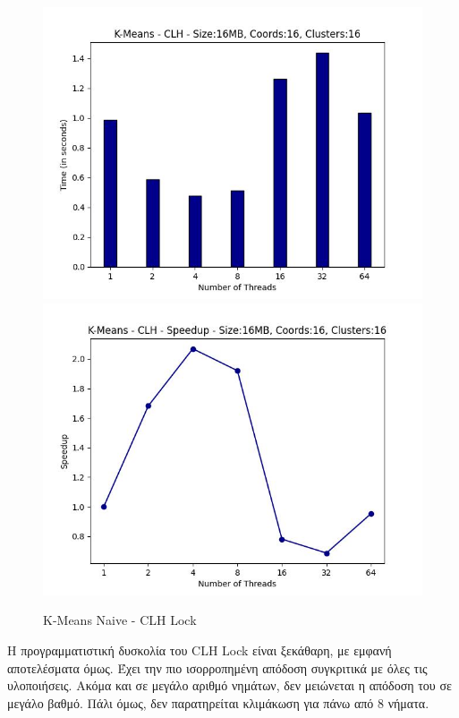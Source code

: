 \documentclass[../final_report.tex]{subfiles}
\begin{document}
\begin{figure}[H]
    \centering
        \includegraphics[scale=0.48]{outFilesCores/plots/kmeans_locks_clh.jpg}
        \includegraphics[scale=0.48]{outFilesCores/plots/kmeans_locks_clh_speedup.jpg}
    \caption{K-Means Naive - CLH Lock}
    \label{fig:K-Means Naive - CLH Lock}
\end{figure}

Η προγραμματιστική δυσκολία του CLH Lock είναι ξεκάθαρη, με εμφανή αποτελέσματα όμως. Έχει την πιο
ισορροπημένη απόδοση συγκριτικά με όλες τις υλοποιήσεις. Ακόμα και σε μεγάλο αριθμό νημάτων, δεν μειώνεται η 
απόδοση του σε μεγάλο βαθμό. Πάλι όμως, δεν παρατηρείται κλιμάκωση για πάνω από 8 νήματα. 
\end{document}
